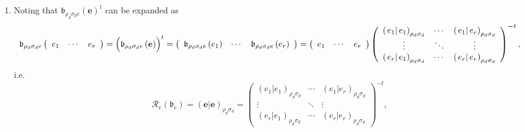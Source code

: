 \documentclass[aps,preprint]{revtex4}
\begin{document}
\begin{enumerate}
\begin{enumerate}
\item Noting that $\mathfrak{b}_{\rho _{d}\sigma _{d}e}\left( \boldsymbol{e}%
\right) ^{t}$ can be expanded as 
\begin{equation}
\mathfrak{b}_{\rho _{d}\sigma _{d}e}\left( 
\begin{array}{ccc}
e_{1} & \cdots & e_{r}%
\end{array}%
\right) =\left( \overset{}{\mathfrak{b}_{\rho _{d}\sigma _{d}e}\left( 
\boldsymbol{e}\right) }\right) ^{t}=\left( 
\begin{array}{ccc}
\mathfrak{b}_{\rho _{d}\sigma _{d}e}\left( e_{1}\right) & \cdots & \mathfrak{%
b}_{\rho _{d}\sigma _{d}e}\left( e_{r}\right)%
\end{array}%
\right) =\left( 
\begin{array}{ccc}
e_{1} & \cdots & e_{r}%
\end{array}%
\right) \left( 
\begin{array}{ccc}
\left( \left. e_{1}\right\vert e_{1}\right) _{\rho _{d}\sigma _{d}} & \cdots
& \left( \left. e_{1}\right\vert e_{r}\right) _{\rho _{d}\sigma _{d}} \\ 
\vdots & \ddots & \vdots \\ 
\left( \left. e_{r}\right\vert e_{1}\right) _{\rho _{d}\sigma _{d}} & \cdots
& \left( \left. e_{r}\right\vert e_{r}\right) _{\rho _{d}\sigma _{d}}%
\end{array}%
\right) ^{\boldsymbol{-}t},
\end{equation}%
i.e.%
\begin{equation}
\mathcal{R}_{e}\left( \mathfrak{b}_{e}\right) =\left( \left. \boldsymbol{e}%
\right\vert \boldsymbol{e}\right) _{\rho _{d}\sigma _{d}}=\left( 
\begin{array}{ccc}
\left( \left. e_{1}\right\vert e_{1}\right) _{\rho _{d}\sigma _{d}} & \cdots
& \left( \left. e_{1}\right\vert e_{r}\right) _{\rho _{d}\sigma _{d}} \\ 
\vdots & \ddots & \vdots \\ 
\left( \left. e_{r}\right\vert e_{1}\right) _{\rho _{d}\sigma _{d}} & \cdots
& \left( \left. e_{r}\right\vert e_{r}\right) _{\rho _{d}\sigma _{d}}%
\end{array}%
\right) ^{\boldsymbol{-}t},
\end{equation}


\end{enumerate}
\end{enumerate}
\end{document}
